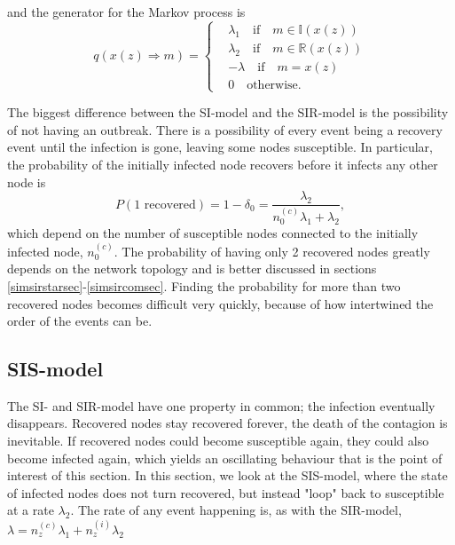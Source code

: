 \documentclass[12pt]{article} %
\numberwithin{equation}{section}
\begin{document}
and the generator for the Markov process is
\begin{equation}\label{qstarSIR}
    q(x(z)\Rightarrow m) = 
    \begin{cases}
    & \lambda_1 \quad \text{if} \quad m \in \mathbb{I}(x(z)) \\
     & \lambda_2 \quad \text{if} \quad m \in \mathbb{R}(x(z)) \\
    & -\lambda   \quad \text{if} \quad m = x(z)\\
    & 0 \quad \text{otherwise.}
    \end{cases}
\end{equation}

The biggest difference between the SI-model and the SIR-model is the possibility of not having an outbreak. There is a possibility of every event being a recovery event until the infection is gone, leaving some nodes susceptible. In particular, the probability of the initially infected node recovers before it infects any other node is 
\begin{equation}\label{delta0}
    P(\text{1 recovered}) = 1-\delta_0 = \frac{\lambda_2}{n_0^{(c)}\lambda_1+\lambda_2},
\end{equation}
which depend on the number of susceptible nodes connected to the initially infected node, $n_0^{(c)}$. The probability of having only 2 recovered nodes greatly depends on the network topology and is better discussed in sections \ref{simsirstarsec}-\ref{simsircomsec}. Finding the probability for more than two recovered nodes becomes difficult very quickly, because of how intertwined the order of the events can be.
\subsection{SIS-model}\label{sis-model-section}
The SI- and SIR-model have one property in common; the infection eventually disappears. Recovered nodes stay recovered forever, the death of the contagion is inevitable. If recovered nodes could become susceptible again, they could also become infected again, which yields an oscillating behaviour that is the point of interest of this section. In this section, we look at the SIS-model, where the state of infected nodes does not turn recovered, but instead "loop" back to susceptible at a rate $\lambda_2$. The rate of any event happening is, as with the SIR-model, $\lambda = n_z^{(c)}\lambda_1+n_z^{(i)}\lambda_2$
\end{document}

